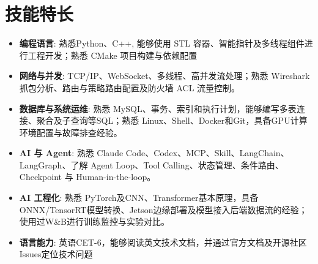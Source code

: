 \documentclass{resume}
\begin{document}
\section{技能特长}
\begin{itemize}[parsep=0.2ex]
  \item \textbf{编程语言}: 熟悉Python、C++, 能够使用 STL 容器、智能指针及多线程组件进行工程开发；熟悉 CMake 项目构建与依赖配置
  \item \textbf{网络与并发}: TCP/IP、WebSocket、多线程、高并发流处理；熟悉 Wireshark 抓包分析、路由与策略路由配置及防火墙 ACL 流量控制。
  \item \textbf{数据库与系统运维}: 熟悉 MySQL、事务、索引和执行计划，能够编写多表连接、聚合及子查询等SQL；熟悉 Linux、Shell、Docker和Git，具备GPU计算环境配置与故障排查经验。
  \item \textbf{AI 与 Agent}: 熟悉 Claude Code、Codex、MCP、Skill、LangChain、LangGraph、了解 Agent Loop、Tool Calling、状态管理、条件路由、Checkpoint 与 Human-in-the-loop。
  \item \textbf{AI 工程化}: 熟悉 PyTorch及CNN、Transformer基本原理，具备ONNX/TensorRT模型转换、Jetson边缘部署及模型接入后端数据流的经验；使用过W\&B进行训练监控与实验对比。
  \item \textbf{语言能力}: 英语CET-6，能够阅读英文技术文档，并通过官方文档及开源社区Issues定位技术问题
\end{itemize}
\end{document}

